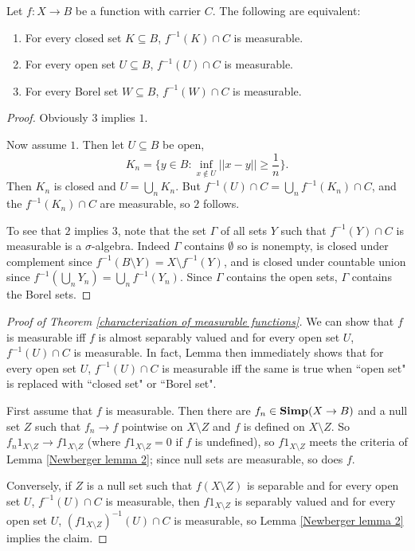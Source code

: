 \begin{lemma}
\label{Newberger lemma 3}
Let $f: X \to B$ be a function with carrier $C$. The following are equivalent:
\begin{enumerate}
\item For every closed set $K \subseteq B$, $f^{-1}(K) \cap C$ is measurable.
\item For every open set $U \subseteq B$, $f^{-1}(U) \cap C$ is measurable.
\item For every Borel set $W \subseteq B$, $f^{-1}(W) \cap C$ is measurable.
\end{enumerate}
\end{lemma}
\begin{proof}
Obviously $3$ implies $1$.

Now assume $1$. Then let $U \subseteq B$ be open,
\[K_{n} = \{y \in B: \inf_{x \notin U} ||x - y|| \geq \frac{1}{n}\}.\]
Then $K_{n}$ is closed and $U = \bigcup_{n} K_{n}$. But $f^{-1}(U) \cap C = \bigcup_{n} f^{-1}(K_{n}) \cap C$, and the $f^{-1}(K_{n}) \cap C$ are measurable, so $2$ follows.

To see that $2$ implies $3$, note that the set $\Gamma$ of all sets $Y$ such that $f^{-1}(Y) \cap C$ is measurable is a $\sigma$-algebra.
Indeed $\Gamma$ contains $\emptyset$ so is nonempty, is closed under complement since $f^{-1}(B \setminus Y) = X \setminus f^{-1}(Y)$, and is closed under countable union since $f^{-1}(\bigcup_{n} Y_{n}) = \bigcup_{n} f^{-1}(Y_{n})$.
Since $\Gamma$ contains the open sets, $\Gamma$ contains the Borel sets.
\end{proof}

\begin{proof}[Proof of Theorem \ref{characterization of measurable functions}]
We can show that $f$ is measurable iff $f$ is almost separably valued and for every open set $U$, $f^{-1}(U) \cap C$ is measurable.
In fact, Lemma \label{Newberger lemma 3} then immediately shows that for every open set $U$, $f^{-1}(U) \cap C$ is measurable iff the same is true when ``open set" is replaced with ``closed set" or ``Borel set".

First assume that $f$ is measurable. Then there are $f_{n} \in \mathbf{Simp}(X \to B)$ and a null set $Z$ such that $f_{n} \to f$ pointwise on $X \setminus Z$ and $f$ is defined on $X \setminus Z$.
So $f_{n}1_{X \setminus Z} \to f1_{X \setminus Z}$ (where $f1_{X \setminus Z} = 0$ if $f$ is undefined), so $f1_{X \setminus Z}$ meets the criteria of Lemma \ref{Newberger lemma 2}; since null sets are measurable, so does $f$.

Conversely, if $Z$ is a null set such that $f(X \setminus Z)$ is separable and for every open set $U$, $f^{-1}(U) \cap C$ is measurable, then $f1_{X \setminus Z}$ is separably valued and for every open set $U$, $(f1_{X \setminus Z})^{-1}(U) \cap C$ is measurable, so Lemma \ref{Newberger lemma 2} implies the claim.
\end{proof}

